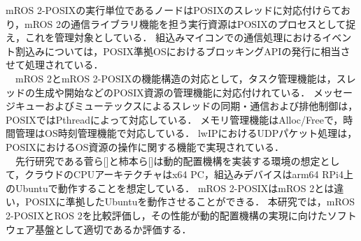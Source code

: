 \documentclass[11pt]{ujarticle}
\begin{document}
mROS 2-POSIXの実行単位であるノードはPOSIXのスレッドに対応付けらており，mROS 2の通信ライブラリ機能を担う実行資源はPOSIXのプロセスとして捉え，これを管理対象としている．
組込みマイコンでの通信処理におけるイベント割込みについては，POSIX準拠OSにおけるブロッキングAPIの発行に相当させて処理されている．
\\　mROS 2とmROS 2-POSIXの機能構造の対応として，タスク管理機能は，スレッドの生成や開始などのPOSIX資源の管理機能に対応付けれている．
メッセージキューおよびミューテックスによるスレッドの同期・通信および排他制御は，POSIXではPthreadによって対応している．
メモリ管理機能はAlloc/Freeで，時間管理はOS時刻管理機能で対応している．
lwIPにおけるUDPパケット処理は，POSIXにおけるOS資源の操作に関する機能で実現されている．
\\　先行研究である菅ら[]と柿本ら[]は動的配置機構を実装する環境の想定として，クラウドのCPUアーキテクチャはx64 PC，組込みデバイスはarm64 RPi4上のUbuntuで動作することを想定している．
mROS 2-POSIXはmROS 2とは違い，POSIXに準拠したUbuntuを動作させることができる．
本研究では，mROS 2-POSIXとROS 2を比較評価し，その性能が動的配置機構の実現に向けたソフトウェア基盤として適切であるか評価する． 
\end{document}
